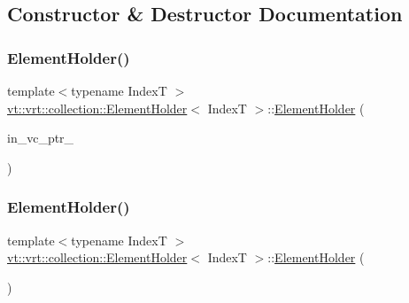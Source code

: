 \subsection{Constructor \& Destructor Documentation}
\mbox{\label{structvt_1_1vrt_1_1collection_1_1_element_holder_aba2cf4951626be16bd2b2c4e52b8d4f5}} 
\subsubsection{\texorpdfstring{Element\+Holder()}{ElementHolder()}\hspace{0.1cm}{\footnotesize\ttfamily [1/2]}}
{\footnotesize\ttfamily template$<$typename IndexT $>$ \\
\hyperlink{structvt_1_1vrt_1_1collection_1_1_element_holder}{vt\+::vrt\+::collection\+::\+Element\+Holder}$<$ IndexT $>$\+::\hyperlink{structvt_1_1vrt_1_1collection_1_1_element_holder}{Element\+Holder} (\begin{DoxyParamCaption}\item[{\hyperlink{structvt_1_1vrt_1_1collection_1_1_element_holder_aab2fd054199e1fed22be78fa1969eb2c}{Virtual\+Ptr\+Type}}]{in\+\_\+vc\+\_\+ptr\+\_\+ }\end{DoxyParamCaption})\hspace{0.3cm}{\ttfamily [explicit]}}

\mbox{\label{structvt_1_1vrt_1_1collection_1_1_element_holder_a36b03582059f06e1e9d60d5c38b53338}} 
\subsubsection{\texorpdfstring{Element\+Holder()}{ElementHolder()}\hspace{0.1cm}{\footnotesize\ttfamily [2/2]}}
{\footnotesize\ttfamily template$<$typename IndexT $>$ \\
\hyperlink{structvt_1_1vrt_1_1collection_1_1_element_holder}{vt\+::vrt\+::collection\+::\+Element\+Holder}$<$ IndexT $>$\+::\hyperlink{structvt_1_1vrt_1_1collection_1_1_element_holder}{Element\+Holder} (\begin{DoxyParamCaption}\item[{\hyperlink{structvt_1_1vrt_1_1collection_1_1_element_holder}{Element\+Holder}$<$ IndexT $>$ \&\&}]{ }\end{DoxyParamCaption})\hspace{0.3cm}{\ttfamily [default]}}

